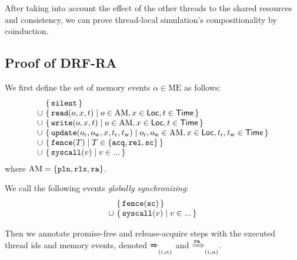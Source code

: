 After taking into account the effect of the other threads to the shared resources and consistency,
we can prove thread-local simulation's compositionality by coinduction.



\subsection{Proof of DRF-RA}
\label{sec:relaxed:proofs:drfra}

\newcommand{\ME}{\textrm{ME}}
\newcommand{\AccMode}{\mathrm{AM}}
\newcommand{\mesilent}{\mathtt{silent}}
\newcommand{\meread}{\mathtt{read}}
\newcommand{\mewrite}{\mathtt{write}}
\newcommand{\meupdate}{\mathtt{update}}
\newcommand{\mefence}{\mathtt{fence}}
\newcommand{\mesyscall}{\mathtt{syscall}}
\newcommand{\mcths}{\mathtt{ths}}
\newcommand{\mcgsc}{\mathtt{gsc}}
\newcommand{\mcmem}{\mathtt{mem}}
\newcommand{\twomsg}[2]{\tup{#1\text{\small@}#2}}

\noindent
We first define the set of memory events $\alpha\in\ME$ as follows:
\[
\begin{array}{@{}c@{~}l@{}}
 & \setof{\mesilent} \\
\cup& \setof{\meread(o,x,t) \suchthat o\in\AccMode ,x\in\Loc,t\in\Time } \\
\cup& \setof{\mewrite(o,x,t) \suchthat o\in\AccMode,x\in\Loc,t\in\Time} \\
\cup& \setof{\meupdate(o_\lr,o_\lw,x,t_\lr,t_\lw) \suchthat o_\lr,o_\lw\in\AccMode,x\in\Loc,t_\lr,t_\lw\in\Time } \\
\cup& \setof{\mefence(T) \suchthat T \in \setofz{\acqo,\relo,\sco} } \\
\cup& \setof{\mesyscall(v) \suchthat v \in ... } \\
\end{array}
\]
where $\AccMode = \setofz{\pln,\rlx,\ra}$. %

We call the following events \emph{globally synchronizing}:
\[
\begin{array}{@{}c@{~}l@{}}
& \setof{\mefence(\sco) } \\
\cup& \setof{\mesyscall(v) \suchthat v \in ... } \\
\end{array}
\]

Then we annotate promise-free and release-acquire steps with 
the executed thread ids and memory events, denoted $\xRightarrow{}_{(i,\alpha)}$ and $\xRightarrow{\texttt{ra}}_{(i,\alpha)}$.

